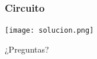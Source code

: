 \documentclass[spanish]{beamer}
\begin{document}
\begin{frame}
  \frametitle{Circuito}

  \begin{center}
    \texttt{[image: solucion.png]}
  \end{center}
\end{frame}

\begin{frame}
  \begin{center}
    \Huge{¿Preguntas?}
  \end{center}
\end{frame}
\end{document}
